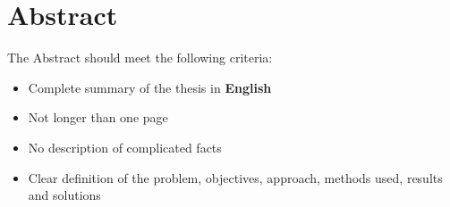\chapter{Abstract}
	
The Abstract should meet the following criteria:
\begin{itemize}
	\item Complete summary of the thesis in \textbf{English}
	\item Not longer than one page
	\item No description of complicated facts
	\item Clear definition of the problem, objectives, approach, methods used, results and solutions
\end{itemize}
